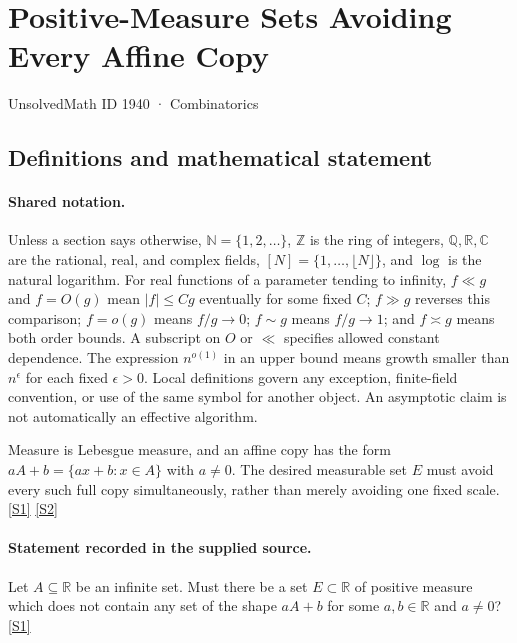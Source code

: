 \documentclass[11pt,a4paper]{article}
\newcommand{\N}{\mathbb{N}}
\newcommand{\Z}{\mathbb{Z}}
\newcommand{\Q}{\mathbb{Q}}
\newcommand{\R}{\mathbb{R}}
\newcommand{\C}{\mathbb{C}}
\newcommand{\sref}[2]{\hyperlink{source:#1:#2}{[S#2]}}
\begin{document}

\setcounter{section}{1939}

\section{Positive-Measure Sets Avoiding Every Affine Copy}\label{1940}

{\small\sffamily UnsolvedMath ID 1940 · Combinatorics}

\subsection{Definitions and mathematical statement}

\paragraph{Shared notation.}Unless a section says otherwise, $\N=\{1,2,\ldots\}$,
$\Z$ is the ring of integers, $\Q,\R,\C$ are the rational, real, and complex
fields, $[N]=\{1,\ldots,\lfloor N\rfloor\}$, and $\log$ is the natural
logarithm. For real functions of a parameter tending to infinity,
$f\ll g$ and $f=O(g)$ mean $|f|\leq Cg$ eventually for some fixed $C$;
$f\gg g$ reverses this comparison; $f=o(g)$ means $f/g\to0$;
$f\sim g$ means $f/g\to1$; and $f\asymp g$ means both order bounds.
A subscript on $O$ or $\ll$ specifies allowed constant dependence.
The expression $n^{o(1)}$ in an upper bound means growth smaller than
$n^\epsilon$ for each fixed $\epsilon>0$. Local definitions govern any
exception, finite-field convention, or use of the same symbol for another
object. An asymptotic claim is not automatically an effective algorithm.



Measure is Lebesgue measure, and an affine copy has the form $aA+b=\{ax+b:x\in A\}$ with $a\ne0$. The desired measurable set $E$ must avoid every such full copy simultaneously, rather than merely avoiding one fixed scale. \sref{1940}{1} \sref{1940}{2}

\paragraph{Statement recorded in the supplied source.}
Let $A\subseteq\mathbb{R}$ be an infinite set. Must there be a set $E\subset \mathbb{R}$ of positive measure which does not contain any set of the shape $aA+b$ for some $a,b\in\mathbb{R}$ and $a\neq 0$? \sref{1940}{1}
\end{document}

